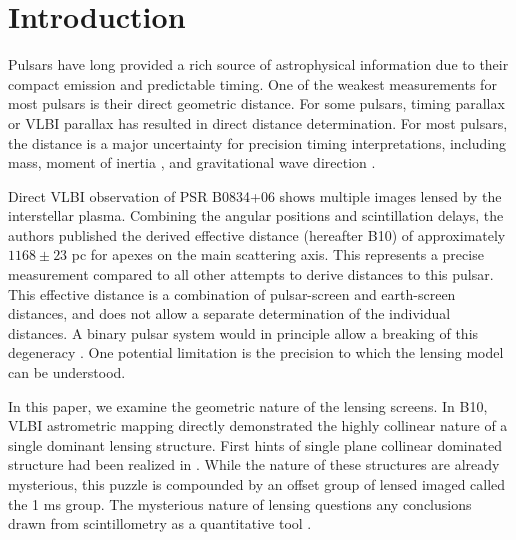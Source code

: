 \documentclass[useAMS,usenatbib]{mn2e}
\begin{document}
\newcommand{\be}{\begin{eqnarray}}
\newcommand{\ee}{\end{eqnarray}}
\newcommand{\beq}{\begin{equation}}
\newcommand{\eeq}{\end{equation}}

\section{Introduction}

Pulsars have long provided a rich source of astrophysical information
due to their compact emission and predictable timing. One of the
weakest measurements for most pulsars is their direct geometric
distance.  For some pulsars, timing parallax or VLBI parallax has
resulted in direct distance determination.  For most pulsars, the
distance is a major uncertainty for precision timing interpretations,
including mass, moment of inertia \citep{2006Sci...314...97K,2012hpa..book.....L}, and
gravitational wave direction \citep{boyle2012}.

Direct VLBI observation of PSR B0834+06 shows multiple images lensed
by the interstellar plasma.  Combining the angular positions and
scintillation delays, the authors published the derived effective
distance \citep{2010ApJ...708..232B} (hereafter B10) of approximately $1168\pm 23$ pc
for apexes on the main scattering axis.
This represents a precise
measurement compared to all other attempts to derive distances to this
pulsar.  This effective distance is a combination of pulsar-screen and
earth-screen distances, and does not allow a separate determination of
the individual distances.  A binary pulsar system would in principle
allow a breaking of this degeneracy \citep{2014MNRAS.442.3338P}. One
potential limitation is the precision to which the lensing model can
be understood.  

In this paper, we examine the geometric nature of the lensing screens.
In B10, VLBI astrometric mapping directly demonstrated the highly
collinear nature of a single dominant lensing structure.  First hints
of single plane collinear dominated structure had been realized in
\citet{2001ApJ...549L..97S}.   While the nature of these structures
are already mysterious, this puzzle is compounded by an offset group
of lensed imaged called the 1 ms group.  The mysterious nature of
lensing questions any conclusions drawn from scintillometry as a
quantitative tool \citep{2014MNRAS.440L..36P}.
\end{document}
